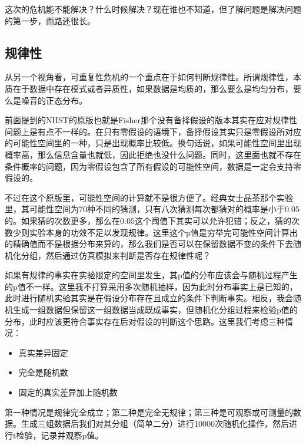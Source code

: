 \documentclass[]{tufte-book}
\providecommand{\tightlist}{%
  \setlength{\itemsep}{0pt}\setlength{\parskip}{0pt}}
\begin{document}
这次的危机能不能解决？什么时候解决？现在谁也不知道，但了解问题是解决问题的第一步，而路还很长。

\hypertarget{ux89c4ux5f8bux6027}{%
\subsection{规律性}\label{ux89c4ux5f8bux6027}}

从另一个视角看，可重复性危机的一个重点在于如何判断规律性。所谓规律性，本质在于数据中存在模式或者异质性，如果数据是均质的，那么要么是均匀分布，要么是噪音的正态分布。

前面提到的NHST的原版也就是Fisher那个没有备择假设的版本其实在应对规律性问题上是有点不一样的。在只有零假设的语境下，备择假设其实只是零假设所对应的可能性空间里的一种，只是出现概率比较低。换句话说，如果可能性空间里出现概率高，那么信息含量也就低，因此拒绝也没什么问题。同时，这里面也就不存在条件概率的问题，因为零假设包含了所有假设的可能性空间，数据是一定会支持零假设的。

不过在这个原版里，可能性空间的计算就不是很方便了。经典女士品茶那个实验里，其可能性空间为70种不同的猜测，只有八次猜测每次都猜对的概率是小于0.05的。如果猜的次数更多，那么在0.05这个阈值下其实可以允许犯错；反之，猜的次数少则实验本身的功效不足以发现规律。这里这个p值是穷举完可能性空间计算出的精确值而不是根据分布来算的，那么我们是否可以在保留数据不变的条件下去随机化分组，然后通过仿真模拟来判断是否存在规律性呢？

如果有规律的事实在实验限定的空间里发生，其p值的分布应该会与随机过程产生的p值不一样。这里我不打算采用多次随机抽样，因为此时分布事实上是已知的，此时进行随机实验其实是在假设分布存在且成立的条件下判断事实。相反，我会随机生成一组数据但保留这一组数据当成既成事实，但随机化分组过程来检验p值的分布，此时应该更符合事实存在后对假设的判断这个思路。这里我们考虑三种情况：

\begin{itemize}
\tightlist
\item
  真实差异固定
\item
  完全是随机数
\item
  固定的真实差异加上随机数
\end{itemize}

第一种情况是规律完全成立；第二种是完全无规律；第三种是可观察或可测量的数据。生成三组数据后我们对其分组（简单二分）进行10000次随机化操作，然后进行t检验，记录并观察p值。
\end{document}
